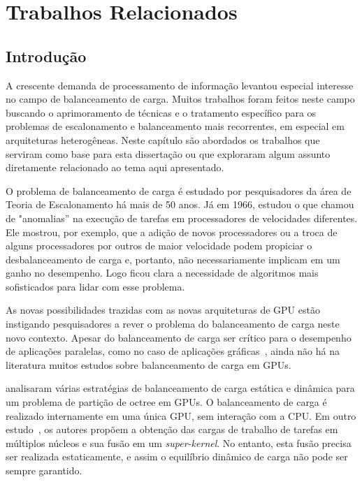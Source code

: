 \pagestyle{empty}
\cleardoublepage
\pagestyle{fancy}
\chapter{Trabalhos Relacionados}\label{cap2}

\section{Introdução}\label{cap2:intro}


A crescente demanda de processamento de informação levantou especial interesse no campo de balanceamento de carga. Muitos trabalhos foram feitos neste campo buscando o aprimoramento de técnicas e o tratamento específico para os problemas de escalonamento e balanceamento mais recorrentes, em especial em arquiteturas heterogêneas. Neste capítulo são abordados os trabalhos que serviram como base para esta dissertação ou que exploraram algum assunto diretamente relacionado ao tema aqui apresentado. 

O problema de balanceamento de carga é estudado por pesquisadores da
área de Teoria de Escalonamento há mais de 50 anos. Já em 1966,
\cite{graham66} estudou o que chamou de "anomalias'' na execução de
tarefas em processadores de velocidades diferentes. Ele mostrou, por
exemplo, que a adição de novos processadores ou a troca de alguns
processadores por outros de maior velocidade podem propiciar o
desbalanceamento de carga e, portanto, não necessariamente implicam em
um ganho no desempenho. Logo ficou clara a necessidade de algoritmos
mais sofisticados para lidar com esse problema. 

As novas possibilidades trazidas com as novas arquiteturas de GPU
estão instigando pesquisadores a rever o problema do balanceamento de
carga neste novo contexto.
Apesar do balanceamento de carga ser
crítico para o desempenho de aplicações paralelas, como no caso de
aplicações gráficas~\cite{kdtree, ray}, ainda não há na literatura muitos
estudos sobre balanceamento de carga em GPUs.

\cite{graphics} analisaram várias estratégias de balanceamento de carga estática
e dinâmica para um problema de partição de octree em GPUs. O balanceamento de
carga é realizado internamente em uma única GPU, sem interação com a CPU. Em
outro estudo~\cite{tasks}, os autores propõem a obtenção das cargas de trabalho
de tarefas em múltiplos núcleos e sua fusão em um \textit{super-kernel}. No
entanto, esta fusão precisa ser realizada estaticamente, e assim o equilíbrio
dinâmico de carga não pode ser sempre garantido.

